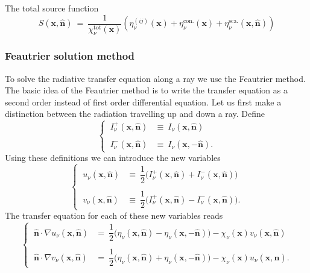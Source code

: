 \documentclass[]{article}
\begin{document}
The total source function
\begin{equation}
S(\textbf{x}, \hat{\textbf{n}}) \ = \ \frac{1}{\chi^{\text{tot}}_{\nu}(\textbf{x})} \left( \eta^{(ij)}_{\nu}(\textbf{x}) + \eta^{\text{con.}}_{\nu}(\textbf{x}) + \eta^{\text{sca.}}_{\nu}(\textbf{x}, \hat{\textbf{n}}) \right)
\end{equation}


\subsubsection{Feautrier solution method}

To solve the radiative transfer equation along a ray we use the Feautrier method. The basic idea of the Feautrier method is to write the transfer equation as a second order instead of first order differential equation. Let us first make a distinction between the radiation travelling up and down a ray. Define
\begin{equation}
\begin{cases}
\ I^{+}_{\nu}(\textbf{x},\hat{\textbf{n}})  &\equiv \ I_{\nu}(\textbf{x},\hat{\textbf{n}}) \\ \\
\ I^{-}_{\nu}(\textbf{x},\hat{\textbf{n}})  &\equiv \ I_{\nu}(\textbf{x},-\hat{\textbf{n}}) .
\end{cases}
\end{equation}
Using these definitions we can introduce the new variables
\begin{equation}
\begin{cases}
\ u_{\nu}(\textbf{x},\hat{\textbf{n}})  &\equiv \ \dfrac{1}{2}\Big( I^{+}_{\nu}(\textbf{x},\hat{\textbf{n}}) + I^{-}_{\nu}(\textbf{x},\hat{\textbf{n}}) \Big) \\ \\
\ v_{\nu}(\textbf{x},\hat{\textbf{n}})  &\equiv \ \dfrac{1}{2}\Big( I^{+}_{\nu}(\textbf{x},\hat{\textbf{n}}) - I^{-}_{\nu}(\textbf{x},\hat{\textbf{n}}) \Big) .
\end{cases}
\end{equation}
The transfer equation for each of these new variables reads
\begin{equation}
\begin{cases}
\ \hat{\textbf{n}} \cdot \nabla u_{\nu}(\textbf{x},\hat{\textbf{n}}) &= \ \dfrac{1}{2} \Big( \eta_{\nu}(\textbf{x},\hat{\textbf{n}}) - \eta_{\nu}(\textbf{x},-\hat{\textbf{n}}) \Big) - \chi_{\nu}(\textbf{x}) v_{\nu}(\textbf{x},\hat{\textbf{n}}) \\ \\
\ \hat{\textbf{n}} \cdot \nabla v_{\nu}(\textbf{x},\hat{\textbf{n}}) &= \ \dfrac{1}{2} \Big( \eta_{\nu}(\textbf{x},\hat{\textbf{n}}) + \eta_{\nu}(\textbf{x},-\hat{\textbf{n}}) \Big) - \chi_{\nu}(\textbf{x}) u_{\nu}(\textbf{x},\hat{\textbf{n}}) .
\end{cases}
\label{uv}
\end{equation}
\end{document}
